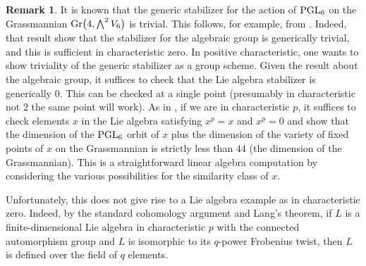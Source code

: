 \documentclass[11pt]{amsart}
\theoremstyle{plain}
\theoremstyle{definition}
\newtheorem{remark}[theorem]{Remark}
\newcommand{\PGL}{{\rm PGL}}
\newcommand{\Gr}{{\rm Gr}}
\renewcommand{\Lambda}{\textstyle\bigwedge}
\begin{document}
\begin{remark}
It is known that the generic stabilizer for the action of
$\PGL_6$ on the Grassmannian $\Gr\big(4,\Lambda^2 V_6\big)$ is trivial.
This follows, for example, from \cite[Table 1.4]{GL24}.
Indeed, that result show that the stabilizer for the algebraic group is generically trivial,
and this is sufficient in characteristic zero.
In positive characteristic, one wants to show triviality of the generic
stabilizer as a group scheme.  Given the result about the algebraic group, it suffices to
check that the Lie algebra stabilizer is generically $0$.  This can be
checked at a single point  (presumably in characteristic not $2$ the
same point will work).
As in \cite{GG20}, if we are in characteristic $p$, it suffices to
check elements $x$ in the Lie algebra satisfying $x^p=x$ and $x^p=0$
and show that the dimension of the $\PGL_6$ orbit of $x$ plus the dimension of the
variety of fixed points of $x$ on the Grassmannian is strictly less
than $44$ (the dimension of the Grassmannian).
This is a straightforward linear algebra computation by considering
the various possibilities for the similarity class of $x$.

Unfortunately, this does not give rise to a Lie algebra example as in
characteristic zero.  Indeed, by the standard cohomology argument and
Lang's theorem, if $L$ is a finite-dimensional Lie algebra in characteristic $p$ with the
connected automorphism group and $L$ is isomorphic to its $q$-power
Frobenius twist, then $L$ is defined over the field of $q$ elements.
\end{remark}
\end{document}
